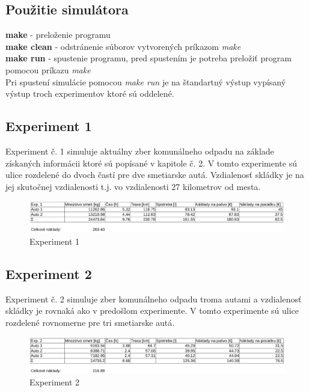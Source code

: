 \documentclass[11pt,a4paper]{article}
\begin{document}
    \subsection{Použitie simulátora}

        \noindent \textbf{make} - preloženie programu\\[0.4em]
        \noindent \textbf{make clean} - odstránenie súborov vytvorených príkazom \textit{make}\\[0.4em]
        \noindent \textbf{make run} - spustenie programu, pred spustením je potreba preložiť program pomocou príkazu \textit{make}\\

        \noindent Pri spustení simulácie pomocou \textit{make run} je na štandartný výstup vypísaný výstup troch experimentov ktoré sú oddelené.

    \subsection{Experiment 1}

        Experiment č. 1 simuluje aktuálny zber komunálneho odpadu na základe získaných informácii ktoré sú popísané v kapitole č. 2. V tomto experimente sú ulice rozdelené do dvoch častí pre dve smetiarske autá. Vzdialenosť skládky je na jej skutočnej vzdialenosti t.j. vo vzdialenosti 27 kilometrov od mesta.

\begin{figure}[h]
    \center
    \includegraphics[scale=0.3]{img/exp1.eps}
    \caption{Experiment 1}
    \label{E1}
\end{figure}
        
        

    \subsection{Experiment 2}

        Experiment č. 2 simuluje zber komunálneho odpadu troma autami a vzdialenosť skládky je rovnaká ako v predošlom experimente. V tomto experimente sú ulice rozdelené rovnomerne pre tri smetiarske autá.

\begin{figure}[h]
    \center
    \includegraphics[scale=0.3]{img/exp2.eps}
    \caption{Experiment 2}
    \label{E2}
\end{figure}
    
\end{document}
